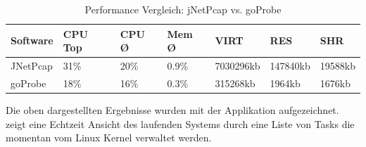 \begin{table}[h]
\begin{tabular}{l|l|l|l|l|l|l}
\textbf{Software} & \textbf{CPU Top} & \textbf{CPU Ø} & \textbf{Mem Ø} & \textbf{VIRT\footnotemark[1]} & \textbf{RES\footnotemark[2]} & \textbf{SHR\footnotemark[3]} \\ \hline
JNetPcap          & 31\%             & 20\%           & 0.9\%          & 7030296kb       & 147840kb       & 19588kb        \\ \hline
goProbe           & 18\%             & 16\%           & 0.3\%          & 315268kb        & 1964kb         & 1676kb         \\
\end{tabular}
\caption{Performance Vergleich: jNetPcap vs. goProbe}
\end{table}

Die oben dargestellten Ergebnisse wurden mit der Applikation  aufgezeichnet.  zeigt eine Echtzeit Ansicht des laufenden Systems durch eine Liste von Tasks die momentan vom Linux Kernel verwaltet werden\cite[:12]{ubuntu_top}.

